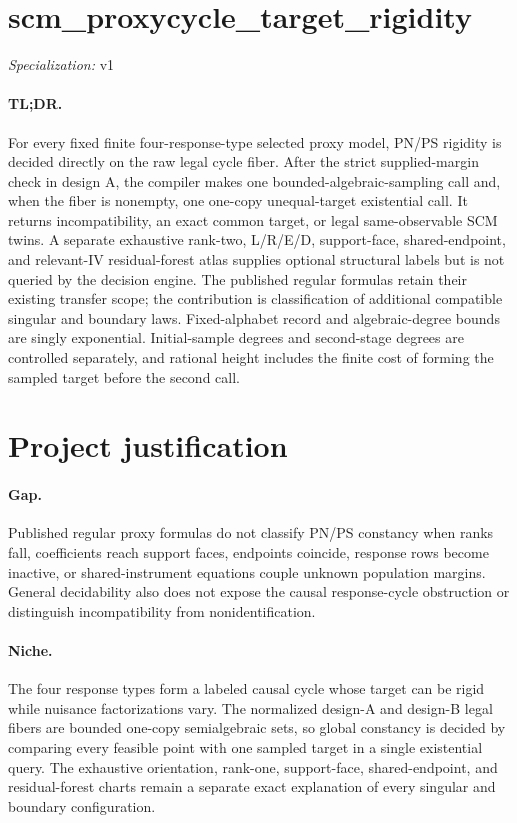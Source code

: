 \documentclass{article}
\begin{document}
\sloppy

\section*{scm\_\allowbreak{}proxycycle\_\allowbreak{}target\_\allowbreak{}rigidity}

\noindent\textit{Specialization:} v1\par

\paragraph{TL;DR.} For every fixed finite four-response-type selected proxy model, PN/PS rigidity is decided directly on the raw legal cycle fiber. After the strict supplied-margin check in design A, the compiler makes one bounded-algebraic-sampling call and, when the fiber is nonempty, one one-copy unequal-target existential call. It returns incompatibility, an exact common target, or legal same-observable SCM twins. A separate exhaustive rank-two, L/R/E/D, support-face, shared-endpoint, and relevant-IV residual-forest atlas supplies optional structural labels but is not queried by the decision engine. The published regular formulas retain their existing transfer scope; the contribution is classification of additional compatible singular and boundary laws. Fixed-alphabet record and algebraic-degree bounds are singly exponential. Initial-sample degrees and second-stage degrees are controlled separately, and rational height includes the finite cost of forming the sampled target before the second call.

\section{Project justification}

\paragraph{Gap.} Published regular proxy formulas do not classify PN/PS constancy when ranks fall, coefficients reach support faces, endpoints coincide, response rows become inactive, or shared-instrument equations couple unknown population margins. General decidability also does not expose the causal response-cycle obstruction or distinguish incompatibility from nonidentification.

\paragraph{Niche.} The four response types form a labeled causal cycle whose target can be rigid while nuisance factorizations vary. The normalized design-A and design-B legal fibers are bounded one-copy semialgebraic sets, so global constancy is decided by comparing every feasible point with one sampled target in a single existential query. The exhaustive orientation, rank-one, support-face, shared-endpoint, and residual-forest charts remain a separate exact explanation of every singular and boundary configuration.
\end{document}
